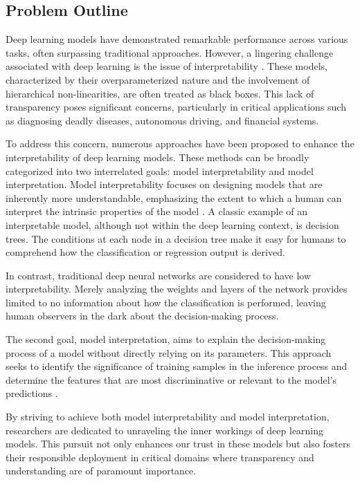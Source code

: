 \documentclass[../main.tex]{subfiles}
\begin{document}
    \subsection{Problem Outline}
        Deep learning models have demonstrated remarkable performance across various tasks, often surpassing traditional approaches. However, a lingering challenge associated with deep learning is the issue of interpretability \cite{doshivelez2017rigorous}. These models, characterized by their overparameterized nature and the involvement of hierarchical non-linearities, are often treated as black boxes. This lack of transparency poses significant concerns, particularly in critical applications such as diagnosing deadly diseases, autonomous driving, and financial systems. \par

        To address this concern, numerous approaches have been proposed to enhance the interpretability of deep learning models. These methods can be broadly categorized into two interrelated goals: model interpretability and model interpretation. Model interpretability focuses on designing models that are inherently more understandable, emphasizing the extent to which a human can interpret the intrinsic properties of the model \cite{li2022interpretable}. A classic example of an interpretable model, although not within the deep learning context, is decision trees. The conditions at each node in a decision tree make it easy for humans to comprehend how the classification or regression output is derived. \par
        
        In contrast, traditional deep neural networks are considered to have low interpretability. Merely analyzing the weights and layers of the network provides limited to no information about how the classification is performed, leaving human observers in the dark about the decision-making process. \par
        
        The second goal, model interpretation, aims to explain the decision-making process of a model without directly relying on its parameters. This approach seeks to identify the significance of training samples in the inference process and determine the features that are most discriminative or relevant to the model's predictions \cite{ribeiro2016why}. \par
        
        By striving to achieve both model interpretability and model interpretation, researchers are dedicated to unraveling the inner workings of deep learning models. This pursuit not only enhances our trust in these models but also fosters their responsible deployment in critical domains where transparency and understanding are of paramount importance. \par
\end{document}
